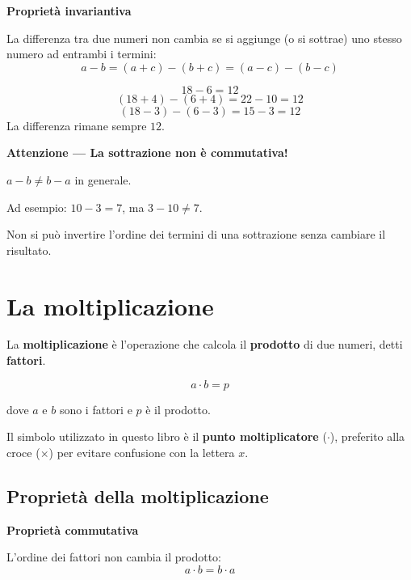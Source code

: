 \begin{regola}
  \textbf{Proprietà invariantiva}

  La differenza tra due numeri non cambia se si aggiunge (o si sottrae) uno stesso numero ad entrambi i termini:
  \[
    a - b = (a + c) - (b + c) = (a - c) - (b - c)
  \]
\end{regola}

\begin{esempio}
  \[
    18 - 6 = 12
  \]
  \[
    (18 + 4) - (6 + 4) = 22 - 10 = 12
  \]
  \[
    (18 - 3) - (6 - 3) = 15 - 3 = 12
  \]
  La differenza rimane sempre $12$.
\end{esempio}

\begin{attenzione}
  \textbf{Attenzione — La sottrazione non è commutativa!}

  $a - b \neq b - a$ in generale.

  \medskip
  Ad esempio: $10 - 3 = 7$, ma $3 - 10 \neq 7$.

  Non si può invertire l'ordine dei termini di una sottrazione senza cambiare il risultato.
\end{attenzione}

\section{La moltiplicazione}

\begin{definizione}
  La \textbf{moltiplicazione} è l'operazione che calcola il \textbf{prodotto} di due numeri, detti \textbf{fattori}.

  \[
    a \cdot b = p
  \]

  dove $a$ e $b$ sono i fattori e $p$ è il prodotto.

  \medskip
  Il simbolo utilizzato in questo libro è il \textbf{punto moltiplicatore} ($\cdot$), preferito alla croce ($\times$) per evitare confusione con la lettera $x$.
\end{definizione}

\subsection{Proprietà della moltiplicazione}

\begin{regola}
  \textbf{Proprietà commutativa}

  L'ordine dei fattori non cambia il prodotto:
  \[
    a \cdot b = b \cdot a
  \]
\end{regola}

